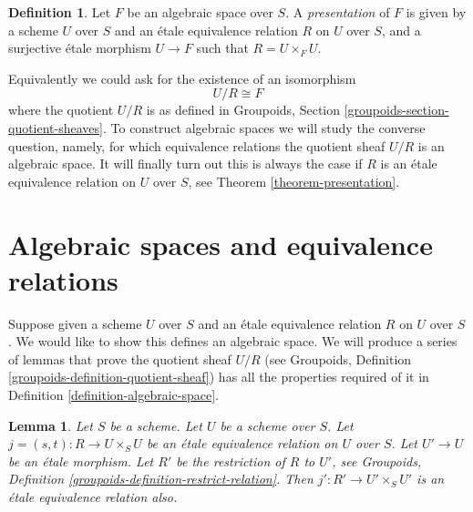 \documentclass{stacks-project}
\theoremstyle{plain}
\newtheorem{lemma}[subsection]{Lemma}
\theoremstyle{definition}
\newtheorem{definition}[subsection]{Definition}
\theoremstyle{remark}
\numberwithin{equation}{subsection}
\begin{document}
\begin{definition}
\label{definition-presentation}
Let $F$ be an algebraic space over $S$.
A {\it presentation} of $F$ is given by a scheme
$U$ over $S$ and an \'etale equivalence relation $R$ on $U$ over $S$, and
a surjective \'etale morphism $U \to F$ such that $R = U \times_F U$.
\end{definition}

\noindent
Equivalently we could ask for the existence of an isomorphism
$$
U/R \cong F
$$
where the quotient $U/R$ is as defined in
Groupoids, Section \ref{groupoids-section-quotient-sheaves}.
To construct algebraic spaces we will study the converse question, namely,
for which equivalence relations the quotient sheaf $U/R$ is an algebraic space.
It will finally turn out this is always the case if $R$ is an \'etale
equivalence relation on $U$ over $S$, see Theorem \ref{theorem-presentation}.





























\section{Algebraic spaces and equivalence relations}
\label{section-spaces-from-equivalence-relations}

\noindent
Suppose given a scheme $U$ over $S$
and an \'etale equivalence relation $R$ on $U$ over $S$.
We would like to show this defines an algebraic space.
We will produce a series of lemmas that prove the quotient sheaf $U/R$
(see Groupoids, Definition \ref{groupoids-definition-quotient-sheaf})
has all the properties required
of it in Definition \ref{definition-algebraic-space}.

\begin{lemma}
\label{lemma-pullback-etale-equivalence-relation}
Let $S$ be a scheme. Let $U$ be a scheme over $S$.
Let $j = (s, t) : R \to U \times_S U$
be an \'etale equivalence relation on $U$ over $S$.
Let $U' \to U$ be an \'etale morphism.
Let $R'$ be the restriction of $R$ to $U'$, see
Groupoids, Definition \ref{groupoids-definition-restrict-relation}.
Then $j' : R' \to U' \times_S U'$ is an \'etale equivalence
relation also.
\end{lemma}
\end{document}
